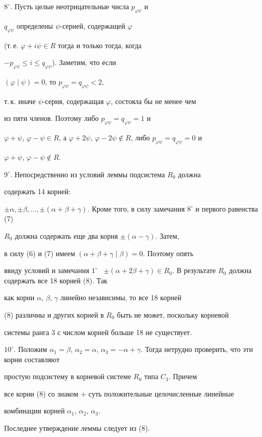 \begin{pf}
$8^\circ$. Пусть целые неотрицательные числа $p_{\varphi \psi }$ и


$q_{\varphi \psi }$ определены $\psi $-серией, содержащей $\varphi $


(т.\,е. $\varphi +i\psi \in R$ тогда и только тогда, когда


$-p_{\varphi \psi }\le i \le q_{\varphi \psi }$). Заметим, что если


$(\varphi \mid \psi )=0$, то $p_{\varphi \psi }=q_{\varphi \psi }<2$,


т.\,к. иначе $\psi$-серия, содержащая $\varphi$, состояла бы не менее чем


из пяти членов. Поэтому либо $p_{\varphi \psi }=q_{\varphi \psi }=1$ и


$\varphi +\psi$, $\varphi -\psi \in R$, а $\varphi +2\psi $, $\varphi


-2\psi \notin R$, либо $p_{\varphi \psi }=q_{\varphi \psi }=0$ и


$\varphi +\psi$, $\varphi -\psi \notin R$.





$9^\circ$. Непосредственно из условий леммы подсистема $R_0$ должна


содержать 14 корней:\linebreak


$\pm \alpha ,\pm \beta ,\dotsc,\pm (\alpha+\beta+


\gamma)$. Кроме того, в силу замечания $8^\circ$ и первого равенства (7)


$R_0$ должна содержать еще два корня $\pm (\alpha -\gamma )$. Затем,


в силу (6) и (7) имеем $(\alpha+\beta+\gamma\mid \beta)=0$. Поэтому опять


ввиду условий и замечания $1^\circ$ \ $\pm(\alpha+2\beta+\gamma)


\in R_0$. В результате $R_0$ должна содержать все 18 корней (8). Так


как корни $\alpha$, $\beta$, $\gamma$ линейно независимы, то все 18 корней


(8) различны и других корней в $R_0$ быть не может, поскольку корневой


системы ранга 3 с числом корней больше 18 не существует.





$10^\circ$. Положим $\alpha_1=\beta$, $\alpha_2=\alpha$, $\alpha_3=-\alpha+


\gamma$. Тогда нетрудно проверить, что эти корни составляют


простую подсистему в корневой системе $R_0$ типа $C_3$. Причем


все корни (8) со знаком $+$ суть положительные целочисленные линейные


комбинации корней $\alpha_1$, $\alpha_2$, $\alpha_3$.





Последнее утверждение леммы следует из (8).


\end{pf}





